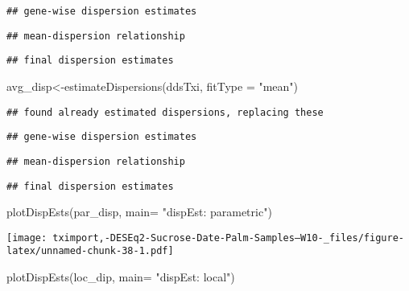 \documentclass[
]{article}
\newenvironment{Shaded}{\begin{snugshade}}{\end{snugshade}}
\newcommand{\AttributeTok}[1]{\textcolor[rgb]{0.77,0.63,0.00}{#1}}
\newcommand{\FunctionTok}[1]{\textcolor[rgb]{0.00,0.00,0.00}{#1}}
\newcommand{\NormalTok}[1]{#1}
\newcommand{\OtherTok}[1]{\textcolor[rgb]{0.56,0.35,0.01}{#1}}
\newcommand{\StringTok}[1]{\textcolor[rgb]{0.31,0.60,0.02}{#1}}
\begin{document}
\begin{verbatim}
## gene-wise dispersion estimates
\end{verbatim}

\begin{verbatim}
## mean-dispersion relationship
\end{verbatim}

\begin{verbatim}
## final dispersion estimates
\end{verbatim}

\begin{Shaded}
\begin{Highlighting}[]
\NormalTok{avg\_disp}\OtherTok{\textless{}{-}}\FunctionTok{estimateDispersions}\NormalTok{(ddsTxi, }\AttributeTok{fitType =} \StringTok{"mean"}\NormalTok{)}
\end{Highlighting}
\end{Shaded}

\begin{verbatim}
## found already estimated dispersions, replacing these
\end{verbatim}

\begin{verbatim}
## gene-wise dispersion estimates
\end{verbatim}

\begin{verbatim}
## mean-dispersion relationship
\end{verbatim}

\begin{verbatim}
## final dispersion estimates
\end{verbatim}

\begin{Shaded}
\begin{Highlighting}[]
\FunctionTok{plotDispEsts}\NormalTok{(par\_disp, }\AttributeTok{main=} \StringTok{"dispEst: parametric"}\NormalTok{)}
\end{Highlighting}
\end{Shaded}

\texttt{[image: tximport,-DESEq2-Sucrose-Date-Palm-Samples--W10-\_files/figure-latex/unnamed-chunk-38-1.pdf]}

\begin{Shaded}
\begin{Highlighting}[]
\FunctionTok{plotDispEsts}\NormalTok{(loc\_dip, }\AttributeTok{main=} \StringTok{"dispEst: local"}\NormalTok{)}
\end{Highlighting}
\end{Shaded}
\end{document}
